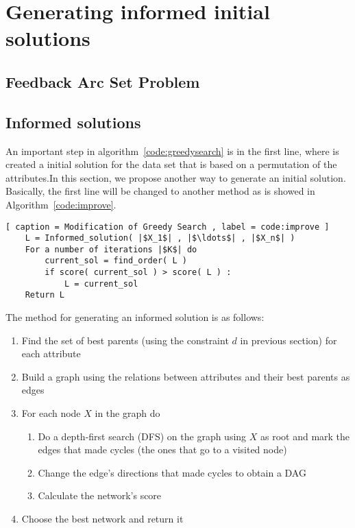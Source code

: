 \section{Generating informed initial solutions}
\label{sec:improve}


\subsection{Feedback Arc Set Problem}
\label{subsec:fasp}

\subsection{Informed solutions}
\label{subsec:solutions}

An important step in algorithm~\ref{code:greedysearch} is in the first line, where is created a initial solution for the data set that is based on a permutation of the attributes.In this section, we propose another way to generate an initial solution. Basically, the first line will be changed to another method as is showed in Algorithm~\ref{code:improve}.

\begin{lstlisting}[ caption = Modification of Greedy Search , label = code:improve ]
	L = Informed_solution( |$X_1$| , |$\ldots$| , |$X_n$| )
	For a number of iterations |$K$| do
		current_sol = find_order( L )
		if score( current_sol ) > score( L ) :
			L = current_sol
	Return L
\end{lstlisting}

The method for generating an informed solution is as follows:
\begin{enumerate}
	\item Find the set of best parents (using the constraint $d$ in previous section) for each attribute
	\item Build a graph using the relations between attributes and their best parents as edges
	\item For each node $X$ in the graph do
		\begin{enumerate}
			\item Do a depth-first search (DFS) on the graph using $X$ as root and mark the edges that made cycles (the ones that go to a visited node)
			\item Change the edge's directions that made cycles to obtain a DAG
			\item Calculate the network's score
		\end{enumerate}
	\item Choose the best network and return it
\end{enumerate}

